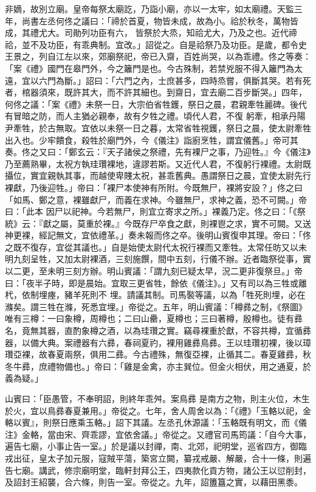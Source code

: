 \begin{pinyinscope}
 非嫡，故別立廟。皇帝每祭太廟訖，乃詣小廟，亦以一太牢，如太廟禮。天監三年，尚書左丞何佟之議曰：「禘於首夏，物皆未成，故為小。祫於秋冬，萬物皆成，其禮尤大。司勛列功臣有六，
 皆祭於大烝，知祫尤大，乃及之也。近代禘祫，並不及功臣，有乖典制。宜改。」詔從之。自是祫祭乃及功臣。是歲，都令史王景之，列自江左以來，郊廟祭祀，帝已入齋，百姓尚哭，以為乖禮。佟之等奏：「案《禮》國門在皋門外，今之籬門是也。今古殊制，若禁兇服不得入籬門為太遠，宜以六門為斷。」詔曰：「六門之內，士庶甚多，四時烝嘗，俱斷其哭。若有死者，棺器須來，既許其大，而不許其細也。到齋日，宜去廟二百步斷哭。」四年，何佟之議：「案《禮》未祭一日，大宗伯省牲鑊，祭日之晨，君親牽牲麗碑。後代有冒暗之防，而人主猶必親奉，故有夕牲之禮。頃代人君，不復
 躬牽，相承丹陽尹牽牲，於古無取。宜依以未祭一日之暮，太常省牲視鑊，祭日之晨，使太尉牽牲出入也。少牢饋食，殺牲於廟門外，今《儀注》詣廚烹牲，謂宜儀舊。」帝可其奏。佟之又曰：「鄭玄云：『天子諸侯之祭禮，先有裸尸之事，乃迎牲。』今《儀注》乃至薦熟畢，太祝方執珪瓚裸地，違謬若斯。又近代人君，不復躬行裸禮。太尉既攝位，實宜親執其事，而越使卑賤太祝，甚乖舊典。愚謂祭日之晨，宜使太尉先行裸獻，乃後迎牲。」帝曰：「裸尸本使神有所附。今既無尸，裸將安設？」佟之曰「如馬、鄭之意，裸雖獻尸，而義在求神。今雖無尸，求神之義，恐不可闕。」帝曰：「此本
 因尸以祀神。今若無尸，則宜立寄求之所。」裸義乃定。佟之曰：「《祭統》云：『獻之屬，莫重於裸。』今既存尸卒食之獻，則裸鬯之求，實不可闕。又送神更裸，經記無文，宜依禮革。」奏未報而佟之卒。後明山賓復申其理。帝曰：「佟之既不復存，宜從其議也。」自是始使太尉代太祝行裸而又牽牲。太常任昉又以未明九刻呈牲，又加太尉裸酒，三刻施饌，間中五刻，行儀不辦。近者臨祭從事，實以二更，至未明三刻方辦。明山賓議：「謂九刻已疑太早，況二更非復祭旦。」帝曰：「夜半子時，即是晨始。宜取三更省牲，餘依《儀注》。」又有司以為三牲或離杙，依制埋瘞，豬羊死則不
 埋。請議其制。司馬褧等議，以為「牲死則埋，必在滌矣。謂三牲在滌，死悉宜埋。」帝從之。五年，明山賓議：「樽彞之制，《祭圖》唯有三樽：一曰象樽，周樽也；二曰山罍，夏樽也；三曰著樽，殷樽也。徒有彞名，竟無其器，直酌象樽之酒，以為珪瓚之實。竊尋裸重於獻，不容共樽，宜循彞器，以備大典。案禮器有六彞，春祠夏礿，裸用雞彞鳥彞。王以珪瓚初裸，後以璋瓚亞裸，故春夏兩祭，俱用二彞。今古禮殊，無復亞裸，止循其二。春夏雞彞，秋冬牛彞，庶禮物備也。」帝曰：「雞是金禽，亦主巽位。但金火相伏，用之通夏，於義為疑。」



 山賓曰：「臣愚管，不奉明詔，則終年乖舛。案鳥彞
 是南方之物，則主火位，木生於火，宜以鳥彞春夏兼用。」帝從之。七年，舍人周舍以為：「《禮》「玉輅以祀，金輅以賓』，則祭日應乘玉輅。」詔下其議。左丞孔休源議：「玉輅既有明文，而《儀注》金輅，當由宋、齊乖謬，宜依舍議。」帝從之。又禮官司馬筠議：「自今大事，遍告七廟，小事止告一室。」於是議以封禪，南、北郊，祀明堂，巡省四方，御臨戎出征，皇太子加元服，寇賊平蕩，築宮立闕，纂戎戒嚴、解嚴，合十一條，則遍告七廟。講武，修宗廟明堂，臨軒封拜公王，四夷款化貢方物，諸公王以愆削封，及詔封王紹襲，合六條，則告一室。帝從之。九年，詔簠簋之實，以藉田黑黍。




\end{pinyinscope}
